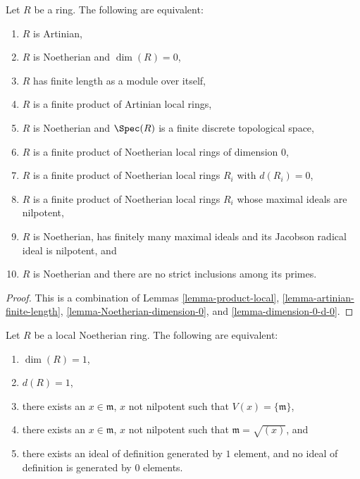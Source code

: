 \begin{proposition}
\label{proposition-dimension-zero-ring}
Let $R$ be a ring. The following are equivalent:
\begin{enumerate}
\item $R$ is Artinian,
\item $R$ is Noetherian and $\dim(R) = 0$,
\item $R$ has finite length as a module over itself,
\item $R$ is a finite product of Artinian local rings,
\item $R$ is Noetherian and $\Spec(R)$ is a
finite discrete topological space,
\item $R$ is a finite product of Noetherian local rings
of dimension $0$,
\item $R$ is a finite product of Noetherian local rings
$R_i$ with $d(R_i) = 0$,
\item $R$ is a finite product of Noetherian local rings
$R_i$ whose maximal ideals are nilpotent,
\item $R$ is Noetherian, has finitely many maximal
ideals and its Jacobson radical ideal is nilpotent, and
\item $R$ is Noetherian and there are no strict inclusions
among its primes.
\end{enumerate}
\end{proposition}

\begin{proof}
This is a combination of Lemmas
\ref{lemma-product-local},
\ref{lemma-artinian-finite-length},
\ref{lemma-Noetherian-dimension-0}, and
\ref{lemma-dimension-0-d-0}.
\end{proof}

\begin{lemma}
\label{lemma-height-1}
Let $R$ be a local Noetherian ring.
The following are equivalent:
\begin{enumerate}
\item
\label{item-dim-1}
$\dim(R) = 1$,
\item
\label{item-d-1}
$d(R) = 1$,
\item
\label{item-Vx}
there exists an $x \in \mathfrak m$, $x$ not nilpotent
such that $V(x) = \{\mathfrak m\}$,
\item
\label{item-x}
there exists an $x \in \mathfrak m$, $x$ not nilpotent
such that $\mathfrak m = \sqrt{(x)}$, and
\item
\label{item-ideal-1}
there exists an ideal of definition generated by $1$ element,
and no ideal of definition is generated by $0$ elements.
\end{enumerate}
\end{lemma}

